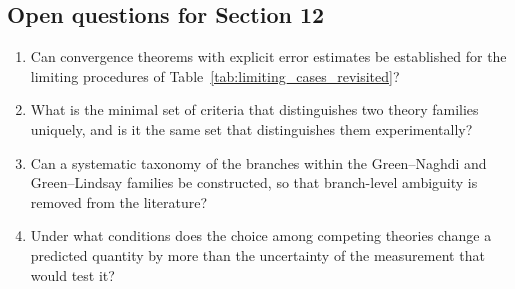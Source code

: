 \subsection{Open questions for Section 12}

\begin{enumerate}[label=\textbf{OQ12.\arabic*}]
\item Can convergence theorems with explicit error estimates be established for the limiting procedures of Table~\ref{tab:limiting_cases_revisited}? \label{oq:12.1}
\item What is the minimal set of criteria that distinguishes two theory families uniquely, and is it the same set that distinguishes them experimentally? \label{oq:12.2}
\item Can a systematic taxonomy of the branches within the Green--Naghdi and Green--Lindsay families be constructed, so that branch-level ambiguity is removed from the literature? \label{oq:12.3}
\item Under what conditions does the choice among competing theories change a predicted quantity by more than the uncertainty of the measurement that would test it? \label{oq:12.4}
\end{enumerate}

